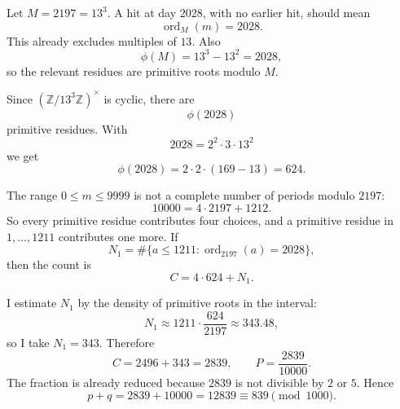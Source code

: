 Let \(M=2197=13^3\).  A hit at day \(2028\), with no earlier hit, should mean
\[
\operatorname{ord}_{M}(m)=2028.
\]
This already excludes multiples of \(13\).  Also
\[
\phi(M)=13^3-13^2=2028,
\]
so the relevant residues are primitive roots modulo \(M\).

Since \((\mathbb Z/13^3\mathbb Z)^\times\) is cyclic, there are
\[
\phi(2028)
\]
primitive residues.  With
\[
2028=2^2\cdot 3\cdot 13^2
\]
we get
\[
\phi(2028)=2\cdot 2\cdot(169-13)=624.
\]

The range \(0\le m\le 9999\) is not a complete number of periods modulo \(2197\):
\[
10000=4\cdot 2197+1212.
\]
So every primitive residue contributes four choices, and a primitive residue in \(1,\ldots,1211\) contributes one more.  If
\[
N_1=\#\{a\le 1211:\operatorname{ord}_{2197}(a)=2028\},
\]
then the count is
\[
C=4\cdot 624+N_1.
\]

I estimate \(N_1\) by the density of primitive roots in the interval:
\[
N_1\approx 1211\cdot \frac{624}{2197}\approx 343.48,
\]
so I take \(N_1=343\).  Therefore
\[
C=2496+343=2839,
\qquad
P=\frac{2839}{10000}.
\]
The fraction is already reduced because \(2839\) is not divisible by \(2\) or \(5\).  Hence
\[
p+q=2839+10000=12839\equiv \boxed{839}\pmod{1000}.
\]
